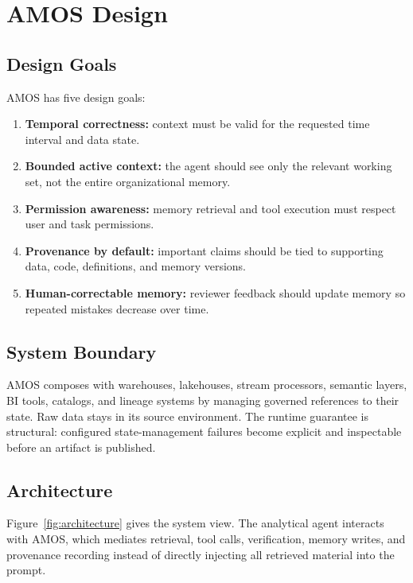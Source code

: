 \documentclass[sigconf,nonacm]{acmart}
\newcommand{\amos}{\textsc{AMOS}\xspace}
\begin{document}
\section{AMOS Design}

\subsection{Design Goals}
\amos has five design goals:
\begin{enumerate}
    \item \textbf{Temporal correctness:} context must be valid for the requested time interval and data state.
    \item \textbf{Bounded active context:} the agent should see only the relevant working set, not the entire organizational memory.
    \item \textbf{Permission awareness:} memory retrieval and tool execution must respect user and task permissions.
    \item \textbf{Provenance by default:} important claims should be tied to supporting data, code, definitions, and memory versions.
    \item \textbf{Human-correctable memory:} reviewer feedback should update memory so repeated mistakes decrease over time.
\end{enumerate}

\subsection{System Boundary}
\amos composes with warehouses, lakehouses, stream processors, semantic layers, BI tools, catalogs, and lineage systems by managing governed references to their state. Raw data stays in its source environment. The runtime guarantee is structural: configured state-management failures become explicit and inspectable before an artifact is published.

\subsection{Architecture}
Figure~\ref{fig:architecture} gives the system view. The analytical agent interacts with \amos, which mediates retrieval, tool calls, verification, memory writes, and provenance recording instead of directly injecting all retrieved material into the prompt.
\end{document}
